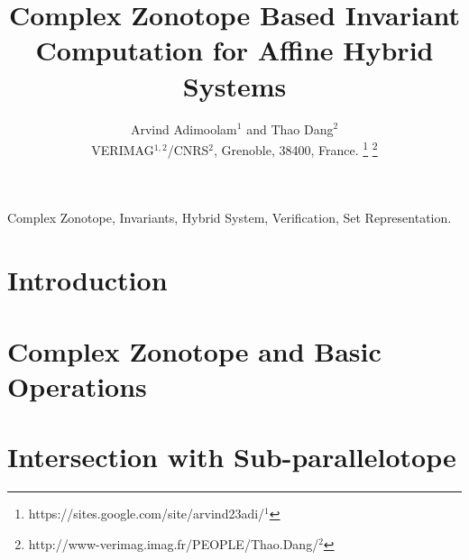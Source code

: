 \documentclass[journal]{./template/stylefiles/IEEEtran}
\begin{document}
\title{Complex Zonotope Based Invariant Computation for Affine Hybrid Systems}

\author{Arvind Adimoolam$^{1}$ and
        Thao Dang$^{2}$\\        
        \small{VERIMAG$^{1,2}$/CNRS$^{2}$, Grenoble, 38400, France.}        
        \thanks{
          {https://sites.google.com/site/arvind23adi/}$^{1}$
        }
        \thanks{
          {http://www-verimag.imag.fr/PEOPLE/Thao.Dang/}$^{2}$
          }
}

\maketitle

\begin{abstract}

\end{abstract}

\begin{IEEEkeywords}
Complex Zonotope, Invariants, Hybrid System, Verification, Set Representation.
\end{IEEEkeywords}

\section{Introduction}


\section{Complex Zonotope and Basic Operations}


\section{Intersection with Sub-parallelotope}




\end{document}
